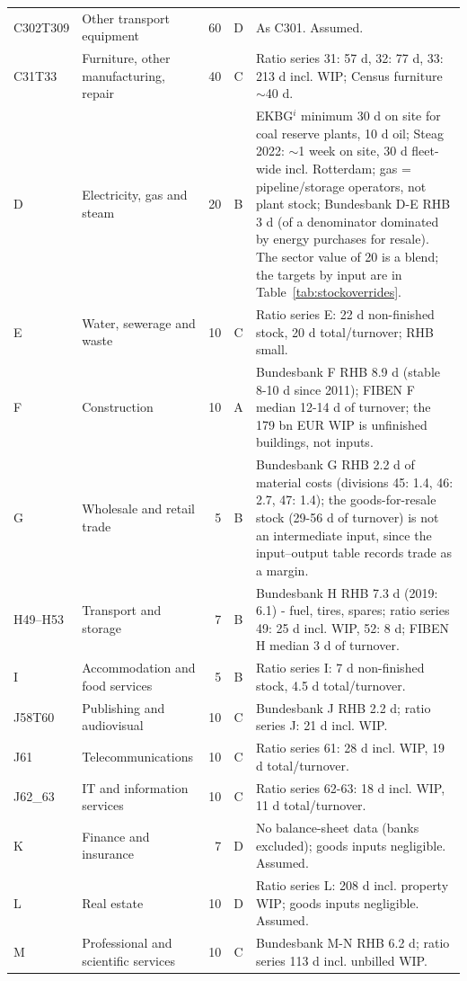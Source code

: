 \begin{longtable}{L{16mm}L{38mm}rcL{76mm}}
C302T309 & Other transport equipment & 60 & D & As C301. Assumed. \\
C31T33 & Furniture, other manufacturing, repair & 40 & C & Ratio series 31: 57 d, 32: 77 d, 33: 213 d incl. WIP; Census furniture $\sim$40 d. \\
D & Electricity, gas and steam & 20 & B & EKBG$^{i}$ minimum 30 d on site for coal reserve plants, 10 d oil; Steag 2022: $\sim$1 week on site, 30 d fleet-wide incl. Rotterdam; gas = pipeline/storage operators, not plant stock; Bundesbank D-E RHB 3 d (of a denominator dominated by energy purchases for resale). The sector value of 20 is a blend; the targets by input are in Table~\ref{tab:stockoverrides}. \\
E & Water, sewerage and waste & 10 & C & Ratio series E: 22 d non-finished stock, 20 d total/turnover; RHB small. \\
F & Construction & 10 & A & Bundesbank F RHB 8.9 d (stable 8-10 d since 2011); FIBEN F median 12-14 d of turnover; the 179 bn EUR WIP is unfinished buildings, not inputs. \\
G & Wholesale and retail trade & 5 & B & Bundesbank G RHB 2.2 d of material costs (divisions 45: 1.4, 46: 2.7, 47: 1.4); the goods-for-resale stock (29-56 d of turnover) is not an intermediate input, since the input--output table records trade as a margin. \\
H49--H53 & Transport and storage & 7 & B & Bundesbank H RHB 7.3 d (2019: 6.1) - fuel, tires, spares; ratio series 49: 25 d incl. WIP, 52: 8 d; FIBEN H median 3 d of turnover. \\
I & Accommodation and food services & 5 & B & Ratio series I: 7 d non-finished stock, 4.5 d total/turnover. \\
J58T60 & Publishing and audiovisual & 10 & C & Bundesbank J RHB 2.2 d; ratio series J: 21 d incl. WIP. \\
J61 & Telecommunications & 10 & C & Ratio series 61: 28 d incl. WIP, 19 d total/turnover. \\
J62\_63 & IT and information services & 10 & C & Ratio series 62-63: 18 d incl. WIP, 11 d total/turnover. \\
K & Finance and insurance & 7 & D & No balance-sheet data (banks excluded); goods inputs negligible. Assumed. \\
L & Real estate & 10 & D & Ratio series L: 208 d incl. property WIP; goods inputs negligible. Assumed. \\
M & Professional and scientific services & 10 & C & Bundesbank M-N RHB 6.2 d; ratio series 113 d incl. unbilled WIP. \\

\end{longtable}
